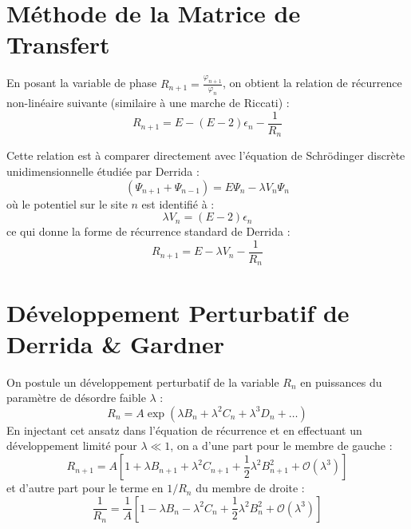 \section{Méthode de la Matrice de Transfert}

En posant la variable de phase $R_{n+1} = \frac{\varphi_{n+1}}{\varphi_n}$, on obtient la relation de récurrence non-linéaire suivante (similaire à une marche de Riccati) :
\begin{equation}
    R_{n+1} = E - (E - 2)\epsilon_n - \frac{1}{R_n} \label{eq:recurrence}
\end{equation}

Cette relation est à comparer directement avec l'équation de Schrödinger discrète unidimensionnelle étudiée par Derrida :
\begin{equation}
    (\Psi_{n+1} + \Psi_{n-1}) = E\Psi_n - \lambda V_n \Psi_n
\end{equation}
où le potentiel sur le site $n$ est identifié à :
\begin{equation}
    \lambda V_n = (E - 2)\epsilon_n
\end{equation}
ce qui donne la forme de récurrence standard de Derrida :
\begin{equation}
    R_{n+1} = E - \lambda V_n - \frac{1}{R_n}
\end{equation}

\section{Développement Perturbatif de Derrida \& Gardner}

On postule un développement perturbatif de la variable $R_n$ en puissances du paramètre de désordre faible $\lambda$ :
\begin{equation}
    R_n = A \exp\left( \lambda B_n + \lambda^2 C_n + \lambda^3 D_n + \dots \right)
\end{equation}
En injectant cet ansatz dans l'équation de récurrence et en effectuant un développement limité pour $\lambda \ll 1$, on a d'une part pour le membre de gauche :
\begin{equation}
    R_{n+1} = A \left[ 1 + \lambda B_{n+1} + \lambda^2 C_{n+1} + \frac{1}{2}\lambda^2 B_{n+1}^2 + \mathcal{O}(\lambda^3) \right]
\end{equation}
et d'autre part pour le terme en $1/R_n$ du membre de droite :
\begin{equation}
    \frac{1}{R_n} = \frac{1}{A} \left[ 1 - \lambda B_n - \lambda^2 C_n + \frac{1}{2}\lambda^2 B_n^2 + \mathcal{O}(\lambda^3) \right]
\end{equation}

